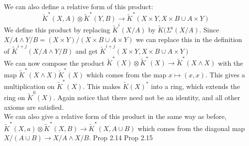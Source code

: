 \documentclass[../Thesis.tex]{subfiles}
\begin{document}
We can also define a relative form of this product:
$$\tilde{K}^*(X,A) \otimes \tilde{K}^*(Y,B) \rightarrow \tilde{K}^*(X \times Y, X \times B \cup A \times Y)$$
We define this product by replacing $\tilde{K}^i(X/A)$ by $\tilde{K}(\Sigma^i(X/A)$. Since $X/A \wedge Y/B = (X \times Y) / (X \times B \cup A \times Y)$ we can replace this in the definition of $\tilde{K}^{i + j}(X/A \wedge Y/B)$ and get $\tilde{K}^{i + j} (X \times Y, X \times B \cup A \times Y)$
\\We can now compose the product $\tilde{K}^*(X) \otimes \tilde{K}^*(X) \rightarrow \tilde{K}^*(X \wedge X)$ with the map $\tilde{K}^*(X \wedge X) \tilde{K}^*(X)$ which comes from the map $x \mapsto (x,x)$. This gives a multiplication on $\tilde{K}^*(X)$. This makes $\tilde{K}(X)^*$ into a ring, which extends the ring on $\tilde{K}^0(X)$. Again notice that there need not be an identity, and all other axioms are satisfied.
\\We can also give a relative form of this product in the same way as before, $\tilde{K}^*(X,a) \otimes \tilde{K}^*(X,B) \rightarrow \tilde{K}^*(X, A \cup B)$ which comes from the diagonal map $X/(A \cup B) \rightarrow X/A \wedge X/B$. 
Prop 2.14
Prop 2.15
\end{document}
